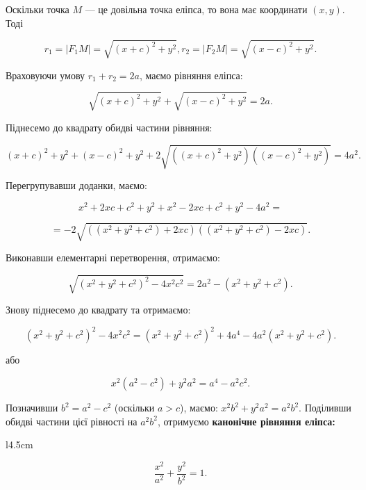 Оскільки точка $M$ --- це довільна точка еліпса, то вона має координати $(x,y)$. Тоді

$$r_1 = |F_1M| = \sqrt{(x+c)^2+y^2}, r_2 = |F_2M| = \sqrt{(x-c)^2+y^2}.$$

Враховуючи умову $r_1 + r_2 = 2a$, маємо рівняння еліпса:

$$\sqrt{(x+c)^2+y^2} + \sqrt{(x-c)^2+y^2} = 2a.$$

Піднесемо до квадрату обидві частини рівняння:

$$(x+c)^2+y^2 + (x-c)^2+y^2 + 2\sqrt{((x+c)^2+y^2)((x-c)^2+y^2)} = 4a^2.$$

Перегрупувавши доданки, маємо:

$$x^2 + 2xc + c^2 + y^2 + x^2 - 2xc + c^2 + y^2 - 4a^2 = $$

$$= -2\sqrt{((x^2 + y^2 + c^2) + 2xc)((x^2 + y^2 + c^2) - 2xc)}.$$

Виконавши елементарні перетворення, отримаємо: 

$$\sqrt{(x^2 + y^2 + c^2)^2 - 4x^2c^2} = 2a^2 - (x^2 + y^2 + c^2).$$

Знову піднесемо до квадрату та отримаємо:

$$(x^2 + y^2 + c^2)^2 - 4x^2c^2 = (x^2 + y^2 + c^2)^2 + 4a^4 - 4a^2(x^2 + y^2 + c^2).$$

\begin{center}
	або
\end{center}	
	
$$x^2(a^2 - c^2) + y^2a^2 = a^4 - a^2c^2.$$

Позначивши $b^2 = a^2 - c^2$ (оскільки $a>c$), маємо: $x^2b^2 + y^2a^2 = a^2b^2$.
Поділивши обидві частини цієї рівності на $a^2b^2$, отримуємо \textbf{канонічне рівняння
еліпса:}

\begin{wrapfigure}{l}{4.5cm}\end{wrapfigure}

$$\dfrac{x^2}{a^2} + \dfrac{y^2}{b^2} = 1.$$

